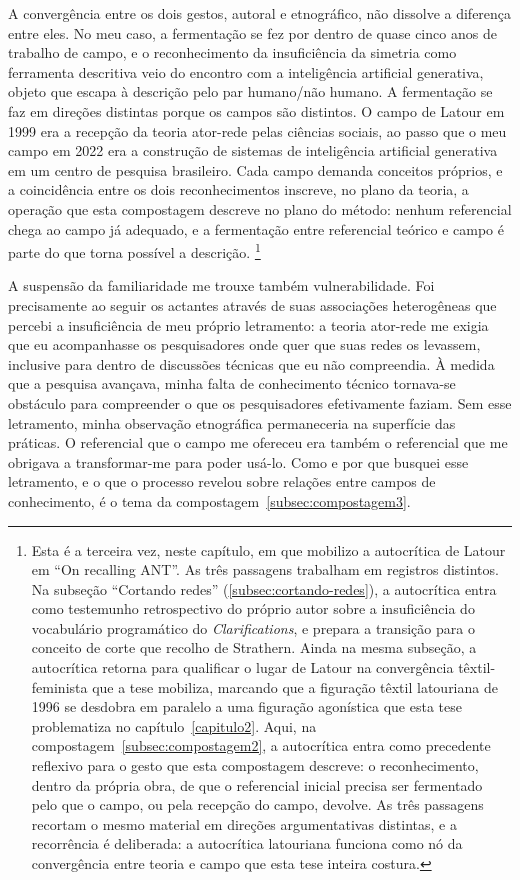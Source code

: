 A convergência entre os dois gestos, autoral e etnográfico, não dissolve a diferença entre eles. No meu caso, a fermentação se fez por dentro de quase cinco anos de trabalho de campo, e o reconhecimento da insuficiência da simetria como ferramenta descritiva veio do encontro com a inteligência artificial generativa, objeto que escapa à descrição pelo par humano/não humano. A fermentação se faz em direções distintas porque os campos são distintos. O campo de Latour em 1999 era a recepção da teoria ator-rede pelas ciências sociais, ao passo que o meu campo em 2022 era a construção de sistemas de inteligência artificial generativa em um centro de pesquisa brasileiro. Cada campo demanda conceitos próprios, e a coincidência entre os dois reconhecimentos inscreve, no plano da teoria, a operação que esta compostagem descreve no plano do método: nenhum referencial chega ao campo já adequado, e a fermentação entre referencial teórico e campo é parte do que torna possível a descrição.
\footnote{Esta é a terceira vez, neste capítulo, em que mobilizo a autocrítica de Latour em \enquote{On recalling ANT}. As três passagens trabalham em registros distintos. Na subseção \enquote{Cortando redes} (\ref{subsec:cortando-redes}), a autocrítica entra como testemunho retrospectivo do próprio autor sobre a insuficiência do vocabulário programático do \textit{Clarifications}, e prepara a transição para o conceito de corte que recolho de Strathern. Ainda na mesma subseção, a autocrítica retorna para qualificar o lugar de Latour na convergência têxtil-feminista que a tese mobiliza, marcando que a figuração têxtil latouriana de 1996 se desdobra em paralelo a uma figuração agonística que esta tese problematiza no capítulo~\ref{capitulo2}. Aqui, na compostagem~\ref{subsec:compostagem2}, a autocrítica entra como precedente reflexivo para o gesto que esta compostagem descreve: o reconhecimento, dentro da própria obra, de que o referencial inicial precisa ser fermentado pelo que o campo, ou pela recepção do campo, devolve. As três passagens recortam o mesmo material em direções argumentativas distintas, e a recorrência é deliberada: a autocrítica latouriana funciona como nó da convergência entre teoria e campo que esta tese inteira costura.}

A suspensão da familiaridade me trouxe também vulnerabilidade. Foi precisamente ao seguir os actantes através de suas associações heterogêneas que percebi a insuficiência de meu próprio letramento: a teoria ator-rede me exigia que eu acompanhasse os pesquisadores onde quer que suas redes os levassem, inclusive para dentro de discussões técnicas que eu não compreendia. À medida que a pesquisa avançava, minha falta de conhecimento técnico tornava-se obstáculo para compreender o que os pesquisadores efetivamente faziam. Sem esse letramento, minha observação etnográfica permaneceria na superfície das práticas. O referencial que o campo me ofereceu era também o referencial que me obrigava a transformar-me para poder usá-lo. Como e por que busquei esse letramento, e o que o processo revelou sobre relações entre campos de conhecimento, é o tema da compostagem~\ref{subsec:compostagem3}.

